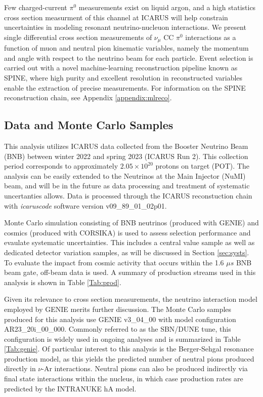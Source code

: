 \documentclass[../main.tex]{subfiles}
\begin{document}
Few charged-current $\pi^{0}$ measurements exist on liquid argon, and a high statistics cross section measurment of this channel at ICARUS will help constrain uncertainties in modeling resonant neutrino-nucleuon interactions.  We present single differential cross section measurements of $\nu_{\mu}$ CC $\pi^{0}$ interactions as a function of muon and neutral pion kinematic variables, namely the momentum and angle with respect to the neutrino beam for each particle.  Event selection is carried out with a novel machine-learning reconstruction pipeline known as SPINE, where high purity and excellent resolution in reconstructed variables enable the extraction of precise measurements.  For information on the SPINE reconstruction chain, see Appendix \ref{appendix:mlreco}.

\subsection{Data and Monte Carlo Samples}
This analysis utilizes ICARUS data collected from the Booster Neutrino Beam (BNB) between winter 2022 and spring 2023 (ICARUS Run 2).  This collection period corresponds to approximately $2.05 \times 10^{20}$ protons on target (POT).  The analysis can be easily extended to the Neutrinos at the Main Injector (NuMI) beam, and will be in the future as data processing and treatment of systematic uncertanties allows.  Data is processed through the ICARUS reconstuction chain with \textit{icaruscode} software version v09\_89\_01\_02p01.

Monte Carlo simulation consisting of BNB neutrinos (produced with GENIE) and cosmics (produced with CORSIKA) is used to assess selection performance and evaulate systematic uncertainties.  This includes a central value sample as well as dedicated detector variation samples, as will be discussed in Section \ref{sec:systs}.  To evaluate the impact from cosmic activity that occurs within the 1.6 $\mu s$ BNB beam gate, off-beam data is used.  A summary of production streams used in this analysis is shown in Table \ref{Tab:prod}.

Given its relevance to cross section measurements, the neutrino interaction model employed by GENIE merits further discussion.  The Monte Carlo samples produced for this analysis use GENIE v3\_04\_00 with model configuration  AR23\_20i\_00\_000.  Commonly referred to as the SBN/DUNE tune, this configuration is widely used in ongoing analyses and is summarized in Table \ref{Tab:genie}.  Of particular interest to this analysis is the Berger-Sehgal resonance production model, as this yields the predicted number of neutral pions produced directly in $\nu$-Ar interactions.  Neutral pions can also be produced indirectly via final state interactions within the nucleus, in which case production rates are predicted by the INTRANUKE hA model.
\end{document}
